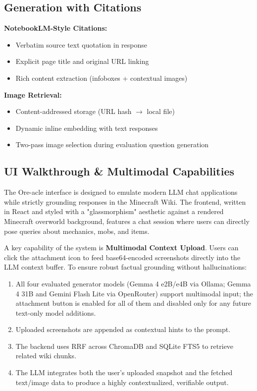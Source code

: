 \documentclass[11pt,a4paper]{article}
\begin{document}
\subsection{Generation with Citations}

\textbf{NotebookLM-Style Citations:}
\begin{itemize}
    \item Verbatim source text quotation in response
    \item Explicit page title and original URL linking
    \item Rich content extraction (infoboxes + contextual images)
\end{itemize}

\textbf{Image Retrieval:}
\begin{itemize}
    \item Content-addressed storage (URL hash $\rightarrow$ local file)
    \item Dynamic inline embedding with text responses
    \item Two-pass image selection during evaluation question generation
\end{itemize}

\subsection{UI Walkthrough \& Multimodal Capabilities}
The Ore-acle interface is designed to emulate modern LLM chat applications while strictly grounding responses in the Minecraft Wiki. The frontend, written in React and styled with a "glassmorphism" aesthetic against a rendered Minecraft overworld background, features a chat session where users can directly pose queries about mechanics, mobs, and items.

A key capability of the system is \textbf{Multimodal Context Upload}. Users can click the attachment icon to feed base64-encoded screenshots directly into the LLM context buffer. To ensure robust factual grounding without hallucinations:
\begin{enumerate}
    \item All four evaluated generator models (Gemma 4 e2B/e4B via Ollama; Gemma 4 31B and Gemini Flash Lite via OpenRouter) support multimodal input; the attachment button is enabled for all of them and disabled only for any future text-only model additions.
    \item Uploaded screenshots are appended as contextual hints to the prompt.
    \item The backend uses RRF across ChromaDB and SQLite FTS5 to retrieve related wiki chunks.
    \item The LLM integrates both the user's uploaded snapshot and the fetched text/image data to produce a highly contextualized, verifiable output.
\end{enumerate}
\end{document}
